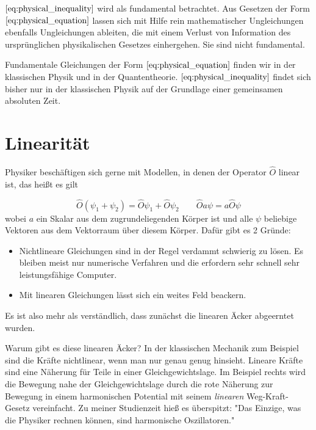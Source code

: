 \documentclass[12pt]{book}
\begin{document}
$\eqref{eq:physical_inequality}$ wird als fundamental betrachtet. Aus Gesetzen der Form $\eqref{eq:physical_equation}$ lassen sich mit Hilfe rein mathematischer Ungleichungen ebenfalls Ungleichungen ableiten, die mit einem Verlust von Information des ursprünglichen physikalischen Gesetzes einhergehen. Sie sind nicht fundamental.

Fundamentale Gleichungen der Form $\eqref{eq:physical_equation}$ finden wir in der klassischen Physik und in der Quantentheorie. $\eqref{eq:physical_inequality}$ findet sich bisher nur in der klassischen Physik auf der Grundlage einer gemeinsamen absoluten Zeit.

\section{Linearität}

Physiker beschäftigen sich gerne mit Modellen, in denen der Operator $\hat{O}$ linear ist, das heißt es gilt

\begin{equation} 
\hat{O}(\psi_1 + \psi_2) = \hat{O}\psi_1 + \hat{O}\psi_2 \quad\quad \hat{O}a\psi = a\hat{O}\psi 
\label{eq:linearity}
\end{equation}
wobei $a$ ein Skalar aus dem zugrundeliegenden Körper ist und alle $\psi$ beliebige Vektoren aus dem Vektorraum über diesem Körper. Dafür gibt es 2 Gründe:
\begin{itemize}
\item Nichtlineare Gleichungen sind in der Regel verdammt schwierig zu lösen. Es bleiben meist nur numerische Verfahren und die erfordern sehr schnell sehr leistungsfähige Computer.
\item Mit linearen Gleichungen lässt sich ein weites Feld beackern.
\end{itemize}
Es ist also mehr als verständlich, dass zunächst die linearen Äcker abgeerntet wurden. 

Warum gibt es diese linearen Äcker? In der klassischen Mechanik zum Beispiel sind die Kräfte nichtlinear, wenn man nur genau genug hinsieht. Lineare Kräfte sind eine Näherung für Teile in einer Gleichgewichtslage. Im Beispiel rechts wird die Bewegung nahe der Gleichgewichtslage durch die rote Näherung zur Bewegung in einem harmonischen Potential mit seinem \emph{linearen} Weg-Kraft-Gesetz vereinfacht. Zu meiner Studienzeit hieß es überspitzt: "Das Einzige, was die Physiker rechnen können, sind harmonische Oszillatoren."
\end{document}
